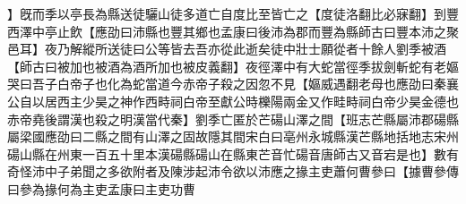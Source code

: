 】旣而季以亭長為縣送徒驪山徒多道亡自度比至皆亡之【度徒洛翻比必寐翻】到豐西澤中亭止飲【應劭曰沛縣也豐其鄉也孟康曰後沛為郡而豐為縣師古曰豐本沛之聚邑耳】夜乃解縱所送徒曰公等皆去吾亦從此逝矣徒中壯士願從者十餘人劉季被酒【師古曰被加也被酒為酒所加也被皮義翻】夜徑澤中有大蛇當徑季拔劍斬蛇有老嫗哭曰吾子白帝子也化為蛇當道今赤帝子殺之因忽不見【嫗威遇翻老母也應劭曰秦襄公自以居西主少昊之神作西畤祠白帝至獻公時櫟陽兩金又作畦畤祠白帝少昊金德也赤帝堯後謂漢也殺之明漢當代秦】劉季亡匿於芒碭山澤之間【班志芒縣屬沛郡碭縣屬梁國應劭曰二縣之間有山澤之固故隱其間宋白曰亳州永城縣漢芒縣地括地志宋州碭山縣在州東一百五十里本漢碭縣碭山在縣東芒音忙碭音唐師古又音宕是也】數有奇怪沛中子弟聞之多欲附者及陳涉起沛令欲以沛應之掾主吏蕭何曹參曰【據曹參傳曰參為掾何為主吏孟康曰主吏功曹